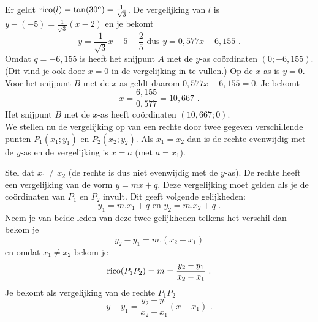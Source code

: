 \begin{voorbeeld}

Er geldt $\operatorname{rico} (l)=\tan (30^o)=\frac {1}{\sqrt{3}}$.
De vergelijking van $l$ is $y-(-5)=\frac{1}{\sqrt{3}}(x-2)$ en je bekomt
\[
y=\frac{1}{\sqrt{3}}x-5-\frac{2}{5} \text { dus } y=0,577x-6,155 \text { .}
\]
Omdat $q=-6,155$ is heeft het snijpunt $A$ met de $y$-as co\"ordinaten $(0;-6,155)$.
(Dit vind je ook door $x=0$ in de vergelijking in te vullen.)
Op de $x$-as is $y=0$. Voor het snijpunt $B$ met de $x$-as geldt daarom $0,577x-6,155=0$.
Je bekomt
\[
x=\frac{6,155}{0,577}=10,667 \text { .}
\]
Het snijpunt $B$ met de $x$-as heeft co\"ordinaten $(10,667;0)$.\\

We stellen nu de vergelijking op van een rechte door twee gegeven verschillende punten $P_1(x_1;y_1)$ en $P_2(x_2;y_2)$.
Als $x_1=x_2$ dan is de rechte evenwijdig met de $y$-as en de vergelijking is $x=a$ (met $a=x_1$).

Stel dat $x_1 \neq x_2$ (de rechte is dus niet evenwijdig met de $y$-as).
De rechte heeft een vergelijking van de vorm $y=mx+q$.
Deze vergelijking moet gelden als je de co\"ordinaten van $P_1$ en $P_2$ invult.
Dit geeft volgende gelijkheden:
\[
y_1=m.x_1+q \text { en } y_2=m.x_2+q \text { .}
\]
Neem je van beide leden van deze twee gelijkheden telkens het verschil dan bekom je
\[
y_2-y_1=m.(x_2-x_1) 
\]
en omdat $x_1 \neq x_2$ bekom je
\[
\operatorname{rico} (P_1P_2)=m=\frac {y_2-y_1}{x_2-x_1} \text { .}
\]
Je bekomt als vergelijking van de rechte $P_1P_2$
\[
y-y_1=\frac {y_2-y_1}{x_2-x_1} (x-x_1) \text { .}
\]\\

\end{voorbeeld}



